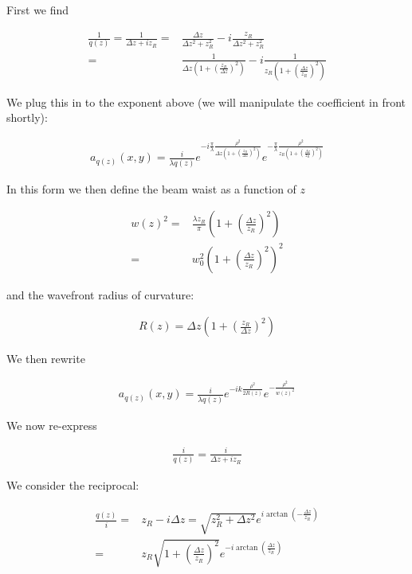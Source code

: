 \documentclass[12pt]{article}
\begin{document}
First we find

\begin{align}
\frac{1}{q(z)} = \frac{1}{\Delta z + i z_R} =& \frac{\Delta z}{\Delta z^2 + z_R^2} - i \frac{z_R}{\Delta z^2 + z_R^2}\\
=& \frac{1}{\Delta z\left(1 + \left(\frac{z_R}{\Delta z}\right)^2\right)} - i \frac{1}{z_R\left(1 + \left(\frac{\Delta z}{z_R}\right)^2\right)}
\end{align}

We plug this in to the exponent above (we will manipulate the coefficient in front shortly):

\begin{align}
a_{q(z)}(x,y) = \frac{i}{\lambda q(z)} e^{-i\frac{\pi}{\lambda} \frac{\rho^2}{\Delta z\left(1+\left(\frac{z_R}{\Delta z}\right)^2\right)}} e^{-\frac{\pi}{\lambda}\frac{\rho^2}{z_R\left(1+\left(\frac{\Delta z}{z_R}\right)^2\right)}}
\end{align}

In this form we then define the beam waist as a function of $z$

\begin{align}
w(z)^2 =& \frac{\lambda z_R}{\pi}\left(1+\left(\frac{\Delta z}{z_R}\right)^2\right)\\
=& w_0^2 \left(1+\left(\frac{\Delta z}{z_R}\right)^2\right)^2
\end{align}

and the wavefront radius of curvature:

\begin{align}
R(z) = \Delta z\left(1+\left(\frac{z_R}{\Delta z}\right)^2\right)
\end{align}

We then rewrite

\begin{align}
a_{q(z)}(x,y) = \frac{i}{\lambda q(z)} e^{-i k \frac{\rho^2}{2R(z)}} e^{- \frac{\rho^2}{w(z)^2}}
\end{align}

We now re-express

\begin{align}
\frac{i}{q(z)} = \frac{i}{\Delta z + iz_R}
\end{align}

We consider the reciprocal:

\begin{align}
\frac{q(z)}{i} =& z_R - i\Delta z= \sqrt{z_R^2 + \Delta z^2} e^{i\arctan\left( - \frac{\Delta z}{z_R}\right)}\\
=& z_R \sqrt{1 + \left(\frac{\Delta z}{z_R}\right)^2} e^{-i\arctan\left(\frac{\Delta z}{z_R}\right)}
\end{align}
\end{document}
